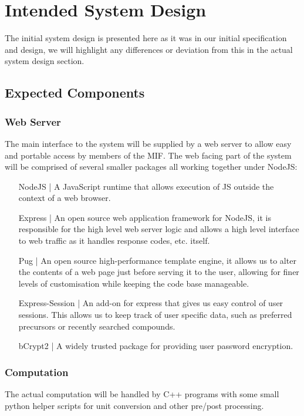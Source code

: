 \section{Intended System Design}
The initial system design is presented here as it was in our initial specification and design, we will highlight any differences or deviation from this in the actual system design section.

\subsection{Expected Components}
\subsubsection{Web Server}
The main interface to the system will be supplied by a web server to allow easy and portable access by members of the MIF. The web facing part of the system will be comprised of several smaller packages all working together under NodeJS:

\begin{enumerate}[label = {}, leftmargin=\widthof{Express-Session |}+\labelsep]
	\item[NodeJS |] A JavaScript runtime that allows execution of JS outside the context of a web browser. 
	
	\item[Express |] An open source web application framework for NodeJS, it is responsible for the high level web server logic and allows a high level interface to web traffic as it handles response codes, etc. itself.
	
	\item[Pug |] An open source high-performance template engine, it allows us to alter the contents of a web page just before serving it to the user, allowing for finer levels of customisation while keeping the code base manageable.
			
	\item[Express-Session |] An add-on for express that gives us easy control of user sessions. This allows us to keep track of user specific data, such as preferred precursors or recently searched compounds.
	
	\item[bCrypt2 |] A widely trusted package for providing user password encryption.
\end{enumerate}

\subsubsection{Computation}
The actual computation will be handled by C++ programs with some small python helper scripts for unit conversion and other pre/post processing. \\

